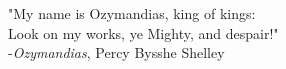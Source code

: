 
\vspace*{\fill}
\begin{center}
"My name is Ozymandias, king of kings:\\
Look on my works, ye Mighty, and despair!"\\
-\textit{Ozymandias}, Percy Bysshe Shelley
\end{center}
\vspace*{\fill}
